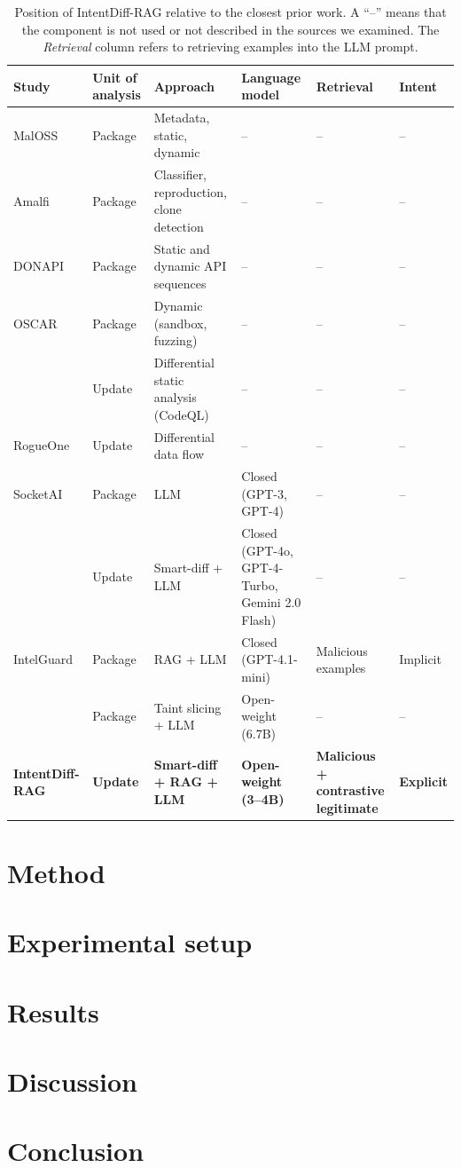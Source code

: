 \documentclass[a4paper,fleqn]{cas-dc}
\begin{document}
\begin{table}[t]
\caption{Position of IntentDiff-RAG relative to the closest prior work. A ``--''
means that the component is not used or not described in the sources we examined.
The \emph{Retrieval} column refers to retrieving examples into the LLM prompt.}
\label{tab:positioning}
\small
\begin{tabular}{p{3.2cm} p{1.6cm} p{3.9cm} p{3.2cm} p{2.4cm} p{1.8cm}}
\hline
Study & Unit of analysis & Approach & Language model & Retrieval & Intent \\
\hline
MalOSS \citep{duan2021towards} & Package & Metadata, static, dynamic & -- & -- & -- \\
Amalfi \citep{sejfia2022practical} & Package & Classifier, reproduction, clone detection & -- & -- & -- \\
DONAPI \citep{huang2024donapi} & Package & Static and dynamic API sequences & -- & -- & -- \\
OSCAR \citep{zheng2024towards} & Package & Dynamic (sandbox, fuzzing) & -- & -- & -- \\
\citet{froh2023differential} & Update & Differential static analysis (CodeQL) & -- & -- & -- \\
RogueOne \citep{sofaer2024rogueone} & Update & Differential data flow & -- & -- & -- \\
SocketAI \citep{zahan2025leveraging} & Package & LLM & Closed (GPT-3, GPT-4) & -- & -- \\
\citet{wyss2025evaluating} & Update & Smart-diff + LLM & Closed (GPT-4o, GPT-4-Turbo, Gemini 2.0 Flash) & -- & -- \\
IntelGuard \citep{guo2026bridging} & Package & RAG + LLM & Closed (GPT-4.1-mini) & Malicious examples & Implicit \\
\citet{nguyen2025taint} & Package & Taint slicing + LLM & Open-weight (6.7B) & -- & -- \\
\textbf{IntentDiff-RAG} & \textbf{Update} & \textbf{Smart-diff + RAG + LLM} & \textbf{Open-weight (3--4B)} & \textbf{Malicious + contrastive legitimate} & \textbf{Explicit} \\
\hline
\end{tabular}
\end{table}

\section{Method}\label{sec:method}

\section{Experimental setup}\label{sec:setup}

\section{Results}\label{sec:results}

\section{Discussion}\label{sec:discussion}

\section{Conclusion}\label{sec:conclusion}

\printcredits



\end{document}
